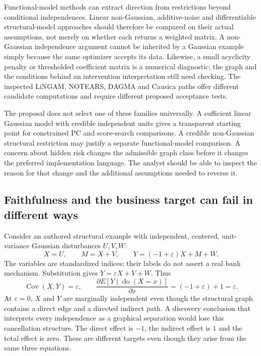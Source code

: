 Functional-model methods can extract direction from restrictions beyond
conditional independences. Linear non-Gaussian, additive-noise and differentiable
structural-model approaches should therefore be compared on their actual
assumptions, not merely on whether each returns a weighted matrix. A
non-Gaussian independence argument cannot be inherited by a Gaussian example
simply because the same optimizer accepts its data. Likewise, a small
acyclicity penalty or thresholded coefficient matrix is a numerical diagnostic;
the graph and the conditions behind an intervention interpretation still need
checking. The inspected LiNGAM, NOTEARS, DAGMA and Causica paths offer
different candidate computations and require different proposed acceptance
tests. \citep{exec13_pydisc_lingam,exec13_pydisc_notears,exec13_pydisc_dagma,exec13_pydisc_causica}

The proposal does not select one of these families universally. A sufficient
linear Gaussian model with credible independent units gives a transparent
starting point for constrained PC and score-search comparisons. A credible
non-Gaussian structural restriction may justify a separate functional-model
comparison. A concern about hidden risk changes the admissible graph class
before it changes the preferred implementation language. The analyst should
be able to inspect the reason for that change and the additional assumptions
needed to reverse it.

\subsection{Faithfulness and the business target can fail in different ways}

Consider an authored structural example with independent, centered,
unit-variance Gaussian disturbances $U,V,W$:
\[
 X=U,\qquad M=X+V,\qquad
 Y=(-1+\varepsilon)X+M+W.
\]
The variables are standardized indices; their labels do not assert a real
bank mechanism. Substitution gives $Y=\varepsilon X+V+W$. Thus
\[
 \operatorname{Cov}(X,Y)=\varepsilon,
 \qquad \frac{\partial E[Y\mid\operatorname{do}(X=x)]}{\partial x}
 =(-1+\varepsilon)+1=\varepsilon.
\]
At $\varepsilon=0$, $X$ and $Y$ are marginally independent even though the
structural graph contains a direct edge and a directed indirect path. A
discovery conclusion that interprets every independence as a graphical
separation would lose this cancellation structure. The direct effect is
$-1$, the indirect effect is $1$ and the total effect is zero. These are
different targets even though they arise from the same three equations.
\citep{exec16_s2_exact}

